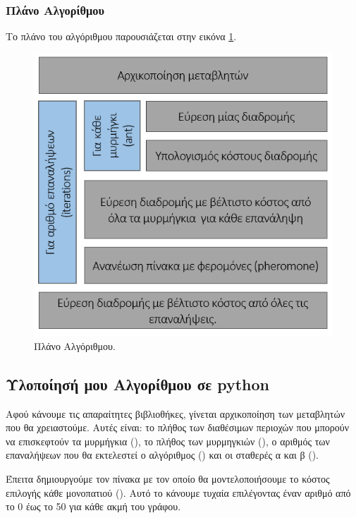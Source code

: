 \subsubsection{Πλάνο Αλγορίθμου}
Το πλάνο του αλγόριθμου παρουσιάζεται στην εικόνα \ref{plan}.
\begin{figure}
    \centering
    \includegraphics[scale=0.80]{2947_thesis/pictures/plan.png} 
    \caption{Πλάνο Αλγόριθμου.}
    \label{plan}
\end{figure}

\subsection{Υλοποίησή μου Αλγορίθμου σε python}
Αφού κάνουμε  τις απαραίτητες βιβλιοθήκες, γίνεται αρχικοποίηση των μεταβλητών που θα χρειαστούμε. Αυτές είναι: το πλήθος των διαθέσιμων περιοχών που μπορούν να επισκεφτούν τα μυρμήγκια (), το πλήθος των μυρμηγκιών (), ο αριθμός των επαναλήψεων που θα εκτελεστεί ο αλγόριθμος () και οι σταθερές α και β ().


Έπειτα δημιουργούμε τον πίνακα με τον οποίο θα μοντελοποιήσουμε το κόστος επιλογής κάθε μονοπατιού (). Αυτό το κάνουμε τυχαία επιλέγοντας έναν αριθμό από το 0 έως το 50 για κάθε ακμή του γράφου.


